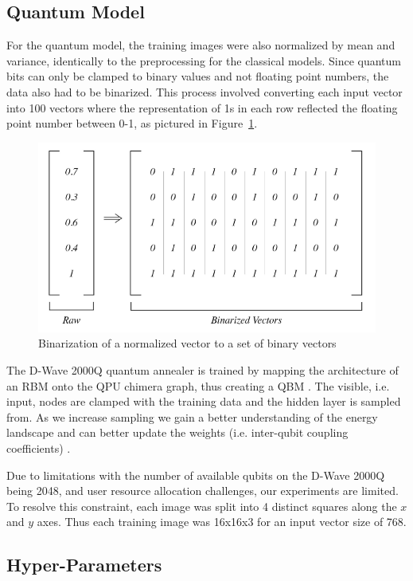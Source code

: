 \documentclass[%
 reprint,
 amsmath,amssymb,
 aps,
]{revtex4-2}
\begin{document}
\subsection{Quantum Model}
\label{binarize}
For the quantum model, the training images were also normalized by mean and variance, identically to the preprocessing for the classical models. Since quantum bits can only be clamped to binary values and not floating point numbers, the data also had to be binarized. This process involved converting each input vector into 100 vectors where the representation of 1s in each row reflected the floating point number between 0-1, as pictured in Figure~\ref{fig:binarize}.

\begin{figure}[h]
    \includegraphics[width=0.9\columnwidth]{binarize.png}
    \caption{\label{fig:binarize} Binarization of a normalized vector to a set of binary vectors \cite{Jain2020}}
\end{figure}


The D-Wave 2000Q quantum annealer is trained by mapping the architecture of an RBM onto the QPU chimera graph, thus creating a QBM \cite{dwavedocs}. The visible, i.e. input, nodes are clamped with the training data and the hidden layer is sampled from. As we increase sampling we gain a better understanding of the energy landscape and can better update the weights (i.e. inter-qubit coupling coefficients) \cite{Jain2020}.


Due to limitations with the number of available qubits on the D-Wave 2000Q being 2048, and user resource allocation challenges, our experiments are limited. To resolve this constraint, each image was split into 4 distinct squares along the $x$ and $y$ axes. Thus each training image was 16x16x3 for an input vector size of 768.

\subsection{Hyper-Parameters}
\end{document}
